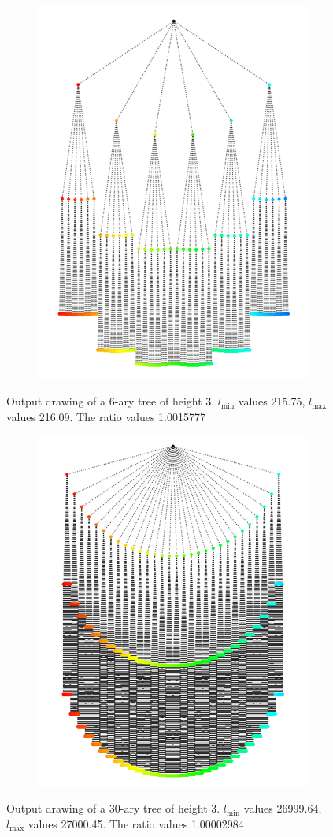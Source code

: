 \begin{figure}[H]
	\centering
	\begin{subfigure}{\textwidth}
		\centering
		\includegraphics[width=0.7\linewidth]{graphics/Implementation_6ary_height_3ver2.png}
	\end{subfigure}
		\caption{Output drawing of a $6$-ary tree of height 3. $l_{\min}$ values 215.75, $l_{\max}$ values 216.09. The ratio values 1.0015777}
\end{figure}
\begin{figure}[H]
	\begin{subfigure}{\textwidth}
		\centering
		\includegraphics[width=0.7\linewidth]{graphics/Implementation_30ary_height_3ver2.png}

	\end{subfigure}
		\caption{Output drawing of a 30-ary tree of height 3. $l_{\min}$ values 26999.64, $l_{\max}$ values 27000.45. The ratio values 1.00002984}
\end{figure}
